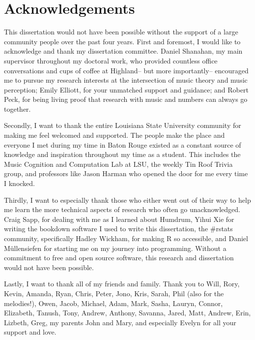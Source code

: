 \documentclass[12pt,]{book}
\begin{document}
\let\cleardoublepage\clearpage

\pagestyle{plain}
\chapter{Acknowledgements}

This dissertation would not have been possible without the support of a large community people over the past four years.
First and foremost, I would like to acknowledge and thank my dissertation committee.
Daniel Shanahan, my main supervisor throughout my doctoral work, who provided countless office conversations and cups of coffee at Highland-- but more importantly-- encouraged me to pursue my research interests at the intersection of music theory and music perception; Emily Elliott, for your unmatched support and guidance; and Robert Peck, for being living proof that research with music and numbers can always go together.

Secondly, I want to thank the entire Louisiana State University community for making me feel welcomed and supported.
The people make the place and everyone I met during my time in Baton Rouge existed as a constant source of knowledge and inspiration throughout my time as a student.
This includes the Music Cognition and Computation Lab at LSU, the weekly Tin Roof Trivia group, and professors like Jason Harman  who opened the door for me every time I knocked.

Thirdly, I want to especially thank those who either went out of their way to help me learn the more technical aspects of research who often go unacknowledged.
Craig Sapp, for dealing with me as I learned about Humdrum, Yihui Xie for writing the bookdown software I used to write this dissertation, the \#rstats community, specifically Hadley Wickham, for making R so accessible, and Daniel Müllensiefen for starting me on my journey into programming.
Without a commitment to free and open source software, this research and dissertation would not have been possible.

Lastly, I want to thank all of my friends and family.
Thank you to Will, Rory, Kevin, Amanda, Ryan, Chris, Peter, Jono, Kris, Sarah, Phil (also for the melodies!), Owen, Jacob, Michael, Adam, Mark, Sasha, Lauryn, Connor, Elizabeth, Tanush, Tony, Andrew, Anthony, Savanna, Jared, Matt, Andrew, Erin, Lizbeth, Greg, my parents John and Mary, and especially Evelyn for all your support and love.
\end{document}

